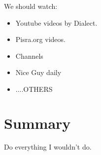 \documentclass[../rzero]{subfiles}
\begin{document}
We should watch:
\begin{itemize}
  \item Youtube videos by Dialect.
  \item Pisra.org videos.
  \item Channels
  \item Nice Guy daily
  \item ....OTHERS
\end{itemize}

\section{Summary}
Do everything I wouldn’t do. 
\end{document}

